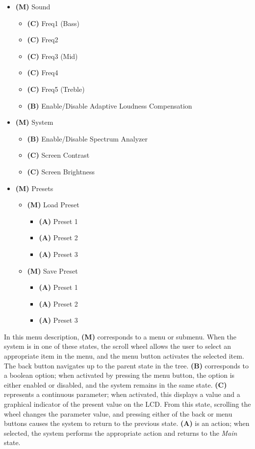 \begin{itemize}

\item \textbf{(M)} Sound
\begin{itemize}
	\item \textbf{(C)} Freq1 (Bass)
	\item \textbf{(C)} Freq2
	\item \textbf{(C)} Freq3 (Mid)
	\item \textbf{(C)} Freq4
	\item \textbf{(C)} Freq5 (Treble)
	\item \textbf{(B)} Enable/Disable Adaptive Loudness Compensation
\end{itemize}

\item \textbf{(M)} System
\begin{itemize}
	\item \textbf{(B)} Enable/Disable Spectrum Analyzer
	\item \textbf{(C)} Screen Contrast
	\item \textbf{(C)} Screen Brightness
\end{itemize}

\item \textbf{(M)} Presets
\begin{itemize}
	\item \textbf{(M)} Load Preset
	\begin{itemize}
		\item \textbf{(A)} Preset 1
		\item \textbf{(A)} Preset 2
		\item \textbf{(A)} Preset 3
	\end{itemize}

	\item \textbf{(M)} Save Preset
	\begin{itemize}
		\item \textbf{(A)} Preset 1
		\item \textbf{(A)} Preset 2
		\item \textbf{(A)} Preset 3
	\end{itemize}
\end{itemize}

\end{itemize}

In this menu description, \textbf{(M)} corresponds to a menu or submenu. When the system is in one of these states, the scroll wheel allows the user to select an appropriate item in the menu, and the menu button activates the selected item. The back button navigates up to the parent state in the tree. \textbf{(B)} corresponds to a boolean option; when activated by pressing the menu button, the option is either enabled or disabled, and the system remains in the same state. \textbf{(C)} represents a continuous parameter; when activated, this displays a value and a graphical indicator of the present value on the LCD. From this state, scrolling the wheel changes the parameter value, and pressing either of the back or menu buttons causes the system to return to the previous state. \textbf{(A)} is an action; when selected, the system performs the appropriate action and returns to the \emph{Main} state.
